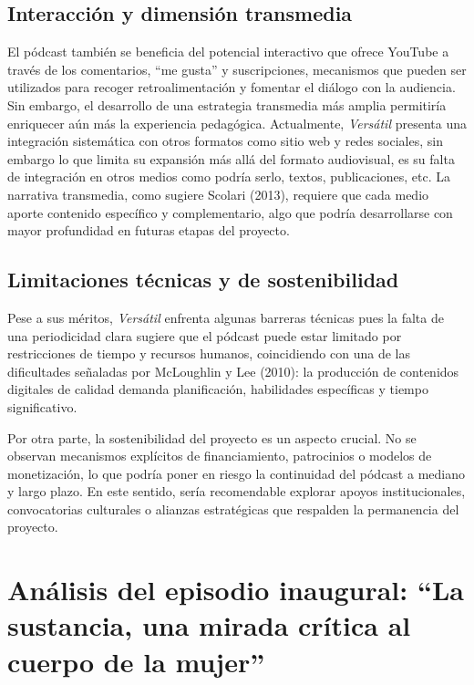\documentclass[
]{interact}
\begin{document}
\subsection{Interacción y dimensión
transmedia}\label{interacciuxf3n-y-dimensiuxf3n-transmedia}

El pódcast también se beneficia del potencial interactivo que ofrece
YouTube a través de los comentarios, ``me gusta'' y suscripciones,
mecanismos que pueden ser utilizados para recoger retroalimentación y
fomentar el diálogo con la audiencia. Sin embargo, el desarrollo de una
estrategia transmedia más amplia permitiría enriquecer aún más la
experiencia pedagógica. Actualmente, \emph{Versátil} presenta una
integración sistemática con otros formatos como sitio web y redes
sociales, sin embargo lo que limita su expansión más allá del formato
audiovisual, es su falta de integración en otros medios como podría
serlo, textos, publicaciones, etc. La narrativa transmedia, como sugiere
Scolari (2013), requiere que cada medio aporte contenido específico y
complementario, algo que podría desarrollarse con mayor profundidad en
futuras etapas del proyecto.

\subsection{Limitaciones técnicas y de
sostenibilidad}\label{limitaciones-tuxe9cnicas-y-de-sostenibilidad}

Pese a sus méritos, \emph{Versátil} enfrenta algunas barreras técnicas
pues la falta de una periodicidad clara sugiere que el pódcast puede
estar limitado por restricciones de tiempo y recursos humanos,
coincidiendo con una de las dificultades señaladas por McLoughlin y Lee
(2010): la producción de contenidos digitales de calidad demanda
planificación, habilidades específicas y tiempo significativo.

Por otra parte, la sostenibilidad del proyecto es un aspecto crucial. No
se observan mecanismos explícitos de financiamiento, patrocinios o
modelos de monetización, lo que podría poner en riesgo la continuidad
del pódcast a mediano y largo plazo. En este sentido, sería recomendable
explorar apoyos institucionales, convocatorias culturales o alianzas
estratégicas que respalden la permanencia del proyecto.

\section{Análisis del episodio inaugural: ``La sustancia, una mirada
crítica al cuerpo de la
mujer''}\label{anuxe1lisis-del-episodio-inaugural-la-sustancia-una-mirada-cruxedtica-al-cuerpo-de-la-mujer}
\end{document}
